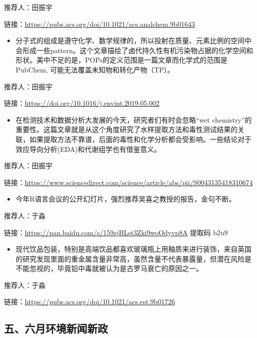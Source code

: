 \documentclass[]{book}
\providecommand{\tightlist}{%
  \setlength{\itemsep}{0pt}\setlength{\parskip}{0pt}}
\begin{document}
推荐人：田振宇

链接：\url{https://pubs.acs.org/doi/10.1021/acs.analchem.9b01643}

\begin{itemize}
\tightlist
\item
  分子式的组成是遵守化学、数学规律的，所以投射在质量、元素比例的空间中会形成一些pattern。这个文章描绘了卤代持久性有机污染物占据的化学空间和形状。美中不足的是，POPs的定义范围是一篇文章而化学式的范围是PubChem, 可能无法覆盖未知物和转化产物（TP）。
\end{itemize}

推荐人：田振宇

链接：\url{https://doi.org/10.1016/j.envint.2019.05.002}

\begin{itemize}
\tightlist
\item
  在检测技术和数据分析大发展的今天，研究者们有时会忽略``wet chemistry''的重要性。这篇文章就是从这个角度研究了水样提取方法和毒性测试结果的关联，如果提取方法不靠谱，后面的毒性和化学分析都会受影响。一些结论对于效应导向分析(EDA)和代谢组学也有借鉴意义。
\end{itemize}

推荐人：田振宇

链接：\url{https://www.sciencedirect.com/science/article/abs/pii/S0043135418310674}

\begin{itemize}
\tightlist
\item
  今年R语言会议的公开幻灯片，强烈推荐吴喜之教授的报告，金句不断。
\end{itemize}

推荐人：于淼

链接：\url{https://pan.baidu.com/s/159zjBLst3Zki9woOdyvp8A} 提取码 b2u9

\begin{itemize}
\tightlist
\item
  现代饮品包装，特别是高端饮品都喜欢玻璃瓶上用釉质来进行装饰，来自英国的研究发现里面的重金属含量非常高，虽然含量不代表暴露量，但潜在风险是不能忽视的，毕竟铅中毒就被认为是古罗马衰亡的原因之一。
\end{itemize}

推荐人：于淼

链接：\url{https://pubs.acs.org/doi/10.1021/acs.est.9b01726}

\hypertarget{ux4e94ux516dux6708ux73afux5883ux65b0ux95fbux65b0ux653f}{%
\subsection*{五、六月环境新闻新政}\label{ux4e94ux516dux6708ux73afux5883ux65b0ux95fbux65b0ux653f}}
\end{document}
